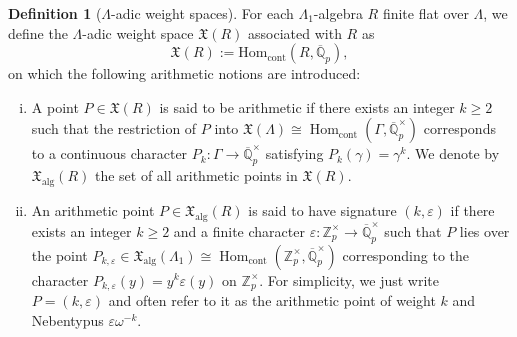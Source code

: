 \documentclass[12pt,a4paper,reqno]{amsart}
\theoremstyle{definition}
\newtheorem{definition}{Definition}
\numberwithin{definition}{subsection}
\theoremstyle{definition}
\numberwithin{Definition}{subsection}
\theoremstyle{remark}
\theoremstyle{remark}
\numberwithin{Remark}{subsection}
\theoremstyle{remark}
\theoremstyle{plain}
\numberwithin{Theorem}{subsection}
\theoremstyle{plain}
\theoremstyle{plain}
\theoremstyle{plain}
\theoremstyle{plain}
\theoremstyle{plain}
\theoremstyle{plain}
\theoremstyle{plain}
\newcommand*{\Z}{\mathbb{Z}}
\newcommand*{\Q}{\mathbb{Q}}
\DeclareMathOperator{\Hom}{Hom}
\begin{document}
\begin{definition}[$\Lambda$-adic weight spaces]
For each $\Lambda_1$-algebra $R$ finite flat over $\Lambda$, we define the $\Lambda$-adic weight space $\mathfrak{X}(R)$ associated with $R$ as
\[
\mathfrak{X}(R):=\text{Hom}_{\text{cont}}(R,\overline{\Q}_p),
\]
on which the following arithmetic notions are introduced:
\begin{enumerate}[(i)]
\item A point $P\in \mathfrak{X}(R)$ is said to be arithmetic if there exists an integer $k\geq 2$ such that the restriction of $P$ into $\mathfrak{X}(\Lambda)\cong \Hom_{\text{cont}}(\Gamma,\overline{\Q}_p^\times)$ corresponds to a continuous character $P_k:\Gamma\to \overline{\Q}_p^\times$ satisfying $P_k(\gamma)=\gamma^k$. We denote by $\mathfrak{X}_{\text{alg}}(R)$ the set of all arithmetic points in $\mathfrak{X}(R)$.
\item An arithmetic point $P\in \mathfrak{X}_{\text{alg}}(R)$ is said to have signature $(k,\varepsilon)$ if there exists an integer $k\geq 2$ and a finite character $\varepsilon:\Z_p^\times\to \overline{\Q}_p^\times$ such that $P$ lies over the point $P_{k,\varepsilon}\in \mathfrak{X}_{\text{alg}}(\Lambda_1)\cong \Hom_{\text{cont}}(\Z_p^\times,\overline{\Q}_p^\times)$ corresponding to the character $P_{k,\varepsilon}(y)=y^k\varepsilon(y)$ on $\Z_p^\times$. For simplicity, we just write $P=(k,\varepsilon)$ and often refer to it as the arithmetic point of weight $k$ and Nebentypus $\varepsilon\omega^{-k}$.
\end{enumerate}
\end{definition} 
\end{document}
